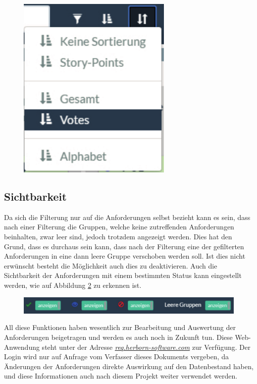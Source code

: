 \begin{figure}[!htb]
		\includegraphics[width=.25\textwidth]{images/sortierunggesamt.pdf}
\centering 
{} 
\label{fig:sortgesamt}
\end{figure}

\subsection{Sichtbarkeit}
Da sich die Filterung nur auf die Anforderungen selbst bezieht kann es sein, dass nach einer Filterung die Gruppen, welche keine zutreffenden Anforderungen beinhalten, zwar leer sind, jedoch trotzdem angezeigt werden. Dies hat den Grund, dass es durchaus sein kann, dass nach der Filterung eine der gefilterten Anforderungen in eine dann leere Gruppe verschoben werden soll. Ist dies nicht erwünscht besteht die Möglichkeit auch dies zu deaktivieren. Auch die Sichtbarkeit der Anforderungen mit einem bestimmten Status kann eingestellt werden, wie auf Abbildung \ref{fig:sichtbarkeit} zu erkennen ist.

\begin{figure}[!htb]
		\includegraphics[width=\textwidth]{images/sichtbarkeit.pdf}
\centering 
{} 
\label{fig:sichtbarkeit}
\end{figure}

All diese Funktionen haben wesentlich zur Bearbeitung und Auswertung der Anforderungen beigetragen und werden es auch noch in Zukunft tun. Diese Web-Anwendung steht unter der Adresse \textit{\href{http://www.req.herborn-software.com}{req.herborn-software.com}} zur Verfügung. Der Login wird nur auf Anfrage vom Verfasser dieses Dokuments vergeben, da Änderungen der Anforderungen direkte Auswirkung auf den Datenbestand haben, und diese Informationen auch nach diesem Projekt weiter verwendet werden.

